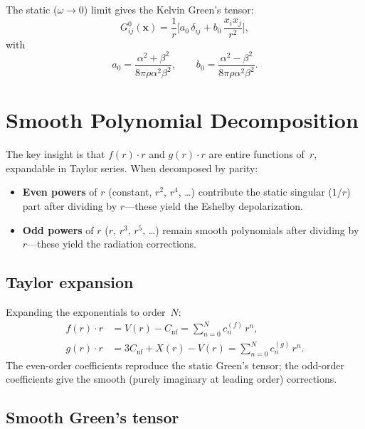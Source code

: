 \documentclass[11pt,a4paper]{article}
\newcommand{\bx}{\mathbf{x}}
\begin{document}
The static ($\omega \to 0$) limit gives the Kelvin Green's tensor:
\begin{equation}
  G^0_{ij}(\bx) = \frac{1}{r}
  \biggl[a_0\,\delta_{ij} + b_0\,\frac{x_i x_j}{r^2}\biggr],
  \label{eq:kelvin}
\end{equation}
with
\begin{equation}
  \boxed{
  a_0 = \frac{\alpha^2 + \beta^2}{8\pi\rho\alpha^2\beta^2},
  \qquad
  b_0 = \frac{\alpha^2 - \beta^2}{8\pi\rho\alpha^2\beta^2}.
  }
  \label{eq:a0b0}
\end{equation}

\section{Smooth Polynomial Decomposition}
\label{sec:smooth}

The key insight is that $f(r) \cdot r$ and $g(r) \cdot r$ are
entire functions of~$r$, expandable in Taylor series. When
decomposed by parity:
\begin{itemize}
  \item \textbf{Even powers} of $r$ (constant, $r^2$, $r^4$,
    \ldots) contribute the static singular ($1/r$) part after
    dividing by $r$---these yield the Eshelby depolarization.
  \item \textbf{Odd powers} of $r$ ($r$, $r^3$, $r^5$,
    \ldots) remain smooth polynomials after dividing by $r$---these
    yield the radiation corrections.
\end{itemize}

\subsection{Taylor expansion}

Expanding the exponentials to order~$N$:
\begin{align}
  f(r) \cdot r &= V(r) - C_\text{nf}
  = \sum_{n=0}^{N} c_n^{(f)}\, r^n, \label{eq:fser} \\
  g(r) \cdot r &= 3C_\text{nf} + X(r) - V(r)
  = \sum_{n=0}^{N} c_n^{(g)}\, r^n. \label{eq:gser}
\end{align}
The even-order coefficients reproduce the static Green's tensor;
the odd-order coefficients give the smooth (purely imaginary at
leading order) corrections.

\subsection{Smooth Green's tensor}
\end{document}
